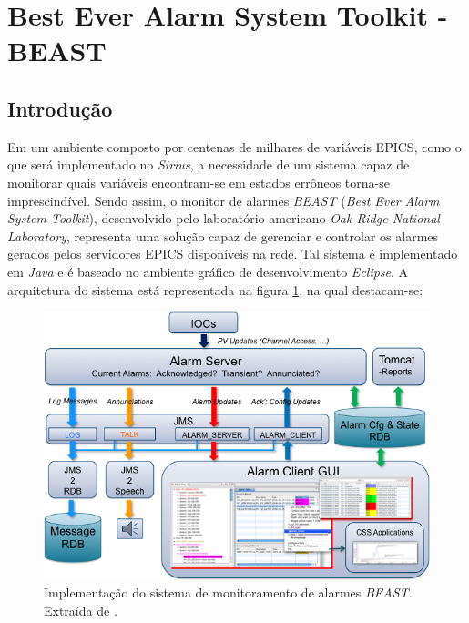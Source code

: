 \section {Best Ever Alarm System Toolkit - BEAST}

\subsection {Introdução} \label{beast-intro}

Em um ambiente composto por centenas de milhares de variáveis EPICS, como o que
será implementado no \textit{Sirius}, a necessidade de um sistema capaz de
monitorar quais variáveis encontram-se em estados errôneos torna-se
imprescindível. Sendo assim, o monitor de alarmes \textit{BEAST} (\textit{Best
Ever Alarm System Toolkit}), desenvolvido pelo laboratório americano \textit{Oak
Ridge National Laboratory}, representa uma solução capaz de gerenciar e
controlar os alarmes gerados pelos servidores EPICS disponíveis na rede. Tal
sistema é implementado em \textit{Java} e é baseado no ambiente gráfico de
desenvolvimento \textit{Eclipse}. A arquitetura do sistema está representada na
figura \ref{fig:best_arquitetura}, na qual destacam-se:

\begin{figure}[h]

\centering
\includegraphics[scale=0.40]{image/beast-arquitetura}
\caption {Implementação do sistema de monitoramento de alarmes
\textit{BEAST}. Extraída de \cite{beast}.}
\label{fig:best_arquitetura}
\end{figure}

% 


